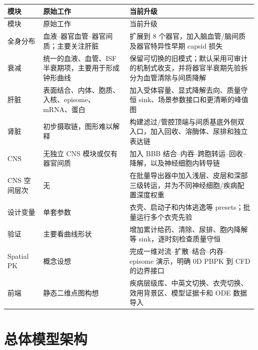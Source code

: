 \documentclass[UTF8,11pt,a4paper]{ctexart}
\begin{document}
\begin{longtable}{p{}p{}p{}}
\toprule
模块 & 原始工作 & 当前升级 \\
\midrule
\endfirsthead
\toprule
模块 & 原始工作 & 当前升级 \\
\midrule
\endhead
全身分布 & 血液--器官血管--器官间质；主要关注肝脏 & 扩展到 8 个器官，加入脑血管/脑间质及器官特异性早期 capsid 损失 \\
衰减 & 统一的血液、血管、ISF 半衰期项，主要用于形成钟形曲线 & 保留可切换的旧模式；默认采用可审计的机制式收支，并将器官半衰期先验拆分为血管清除与间质降解 \\
肝脏 & 表面结合、内体、胞质、入核、episome、mRNA、蛋白 & 加入受体容量、显式降解去向、质量守恒 sink、场景参数接口和更清晰的峰值图 \\
肾脏 & 初步摄取链，图形难以解释 & 构建滤过/管腔顶端与间质基底外侧双入口，加入回收、溶酶体、尿排和独立表达链 \\
CNS & 无独立 CNS 模块或仅有器官间质 & 加入 BBB 结合--内吞--跨胞转运--回收--降解，以及神经细胞内转导链 \\
CNS 空间层次 & 无 & 在批量导出器中加入浅层、皮层和深部三级转运，并为不同神经细胞/疾病配置深度权重 \\
设计变量 & 单套参数 & 衣壳、启动子和内体逃逸等 presets；批量运行多个衣壳先验 \\
验证 & 主要看曲线形状 & 增加累计给药、清除、尿排、胞内降解等 sink，逐时刻检查质量守恒 \\
Spatial PK & 概念设想 & 完成一维对流--扩散--结合--内吞--episome 演示，明确 0D PBPK 到 CFD 的边界接口 \\
前端 & 静态二维点图构想 & 疾病层级库、中英文切换、衣壳切换、效用背景区、模型证据卡和 ODE 数据导入 \\
\bottomrule
\end{longtable}

\section{总体模型架构}
\end{document}
